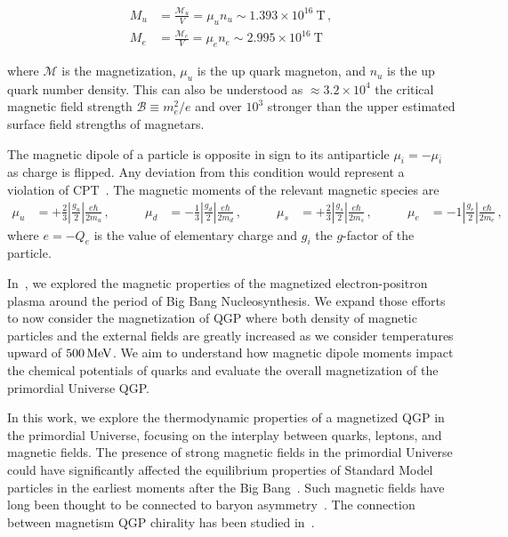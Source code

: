 \documentclass[epjST]{svjour}
\newcommand*{\MeV}{\text{\,MeV}}
\numberwithin{equation}{section}
\begin{document}
\begin{align}
    M_{u}&=\frac{\mathcal{M}_{u}}{V} = \mu_{u}n_{u} \sim 1.393\times10^{16}\ \mathrm{T}\,,\\
    M_{e}&=\frac{\mathcal{M}_{e}}{V} = \mu_{e}n_{e} \sim 2.995\times10^{16}\ \mathrm{T}
\end{align}

where \(\mathcal{M}\) is the magnetization, \(\mu_{u}\) is the up quark magneton, and \(n_{u}\) is the up quark number density. This can also be understood as \(\approx3.2\times10^{4}\) the critical magnetic field strength \(\mathcal{B}\equiv m_{e}^{2}/e\) and over \(10^3\) stronger than the upper estimated surface field strengths of magnetars.

The magnetic dipole of a particle is opposite in sign to its antiparticle $\mu_{i}=-\mu_{\bar{i}}$ as charge is flipped. Any deviation from this condition would represent a violation of CPT~\cite{Colladay:1996iz,Bluhm:1997ci,BASE:2016yuo}. The magnetic moments of the relevant magnetic species are
\begin{align}
    \label{eq:moments}
    \mu_{u}&=+\frac{2}{3}\left|\frac{g_{u}}{2}\right|\frac{e\hbar}{2m_{u}}\,,&\qquad
    \mu_{d}&=-\frac{1}{3}\left|\frac{g_{d}}{2}\right|\frac{e\hbar}{2m_{d}}\,,&\qquad
    \mu_{s}&=+\frac{2}{3}\left|\frac{g_{s}}{2}\right|\frac{e\hbar}{2m_{s}}\,,&\qquad
    \mu_{e}&=-1\left|\frac{g_{e}}{2}\right|\frac{e\hbar}{2m_{e}}\,,&
\end{align}
where $e=-Q_{e}$ is the value of elementary charge and $g_{i}$ the $g$-factor of the particle.

In~\cite{Steinmetz:2023nsc,Steinmetz:2023ucp}, we explored the magnetic properties of the magnetized electron-positron plasma around the period of Big Bang Nucleosynthesis. We expand those efforts to now consider the magnetization of QGP where both density of magnetic particles and the external fields are greatly increased as we consider temperatures upward of $500\MeV$. We aim to understand how magnetic dipole moments impact the chemical potentials of quarks and evaluate the overall magnetization of the primordial Universe QGP.

In this work, we explore the thermodynamic properties of a magnetized QGP in the primordial Universe, focusing on the interplay between quarks, leptons, and magnetic fields. The presence of strong magnetic fields in the primordial Universe could have significantly affected the equilibrium properties of Standard Model particles in the earliest moments after the Big Bang~\cite{Durrer:2013pga,Subramanian:2015lua}. Such magnetic fields have long been thought to be connected to baryon asymmetry~\cite{Vachaspati:1991nm,Baym:1995fk}. The connection between magnetism QGP chirality has been studied in~\cite{Fukushima:2008xe,Boyarsky:2011uy,Bali:2011qj}.
\end{document}
